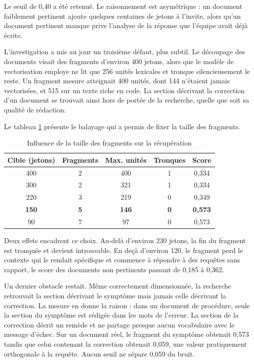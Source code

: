 \documentclass[12pt,a4paper,oneside]{report}
\begin{document}
Le seuil de 0,40 a été retenué. Le raisonnement est asymétrique : un document
faiblement pertinent ajoute quelques centaines de jetons à l'invite, alors qu'un
document pertinent manque prive l'analyse de la réponse que l'équipe avait déjà
écrite.

L'investigation a mis au jour un troisième défaut, plus subtil. Le découpage des
documents visait des fragments d'environ 400 jetons, alors que le modèle de
vectorisation employe ne lit que 256 unités lexicales et tronque
silencieusement le reste. Un fragment mesure atteignait 400 unités, dont 144
n'étaient jamais vectorisées, et 515 sur un texte riche en code. La section
décrivant la correction d'un document se trouvait ainsi hors de portée de la
recherche, quelle que soit sa qualité de rédaction.

Le tableau \ref{tab:decoupage} présente le balayage qui a permis de fixer la
taille des fragments.

\begin{table}[htbp]
\centering
\caption{Influence de la taille des fragments sur la récupération}
\label{tab:decoupage}
\small
\begin{tabular}{@{}ccccc@{}}
\toprule
\textbf{Cible (jetons)} & \textbf{Fragments} & \textbf{Max. unités} & \textbf{Tronques} & \textbf{Score} \\
\midrule
400 & 2 & 400 & 1 & 0,334 \\
300 & 2 & 321 & 1 & 0,334 \\
220 & 3 & 219 & 0 & 0,349 \\
\textbf{150} & \textbf{5} & \textbf{146} & \textbf{0} & \textbf{0,573} \\
90 & 7 & 97 & 0 & 0,573 \\
\bottomrule
\end{tabular}
\end{table}

Deux effets encadrent ce choix. Au-delà d'environ 230 jetons, la fin du fragment
est tronquée et devient introuvable. En deçà d'environ 120, le fragment perd le
contexte qui le rendait spécifique et commence à répondre à des requêtes sans
rapport, le score des documents non pertinents passant de 0,185 à 0,362.

Un dernier obstacle restait. Même correctement dimensionnée, la recherche
retrouvait la section décrivant le symptôme mais jamais celle décrivant la
correction. La mesure en donne la raison : dans un document de procédure, seule la
section du symptôme est rédigée dans les mots de l'erreur. La section de la
correction décrit un remède et ne partage presque aucun vocabulaire avec le
message d'échec. Sur un document réel, le fragment du symptôme obtenait 0,573
tandis que celui contenant la correction obtenait 0,059, une valeur pratiquement
orthogonale à la requête. Aucun seuil ne sépare 0,059 du bruit.
\end{document}
